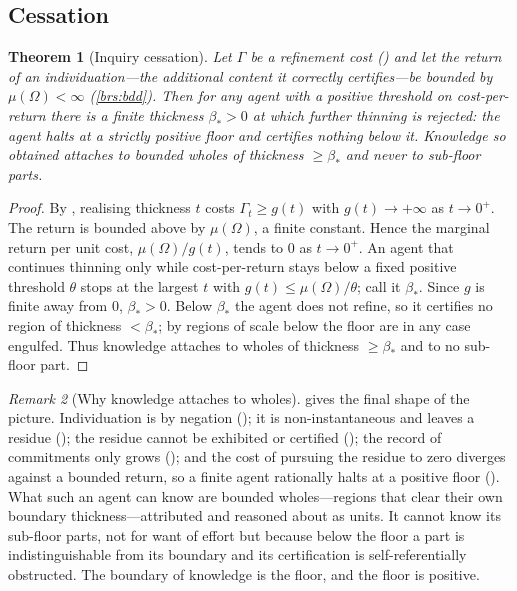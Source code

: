 \documentclass[11pt,a4paper]{article}
\theoremstyle{thmstyle}
\newtheorem{theorem}{Theorem}[section]
\theoremstyle{definition}
\theoremstyle{remark}
\newtheorem{remark}[theorem]{Remark}
\newcommand{\Space}{\Omega}
\newcommand{\thick}{\beta}
\begin{document}
\subsection{Cessation}

\begin{theorem}[Inquiry cessation]
\label{thm:cessation}
Let $\Gamma$ be a refinement cost \textup{(}\textup{)} and let the
return of an individuation---the additional content it correctly certifies---be
bounded by $\mu(\Space)<\infty$ \textup{(}\ref{brs:bdd}\textup{)}. Then for any
agent with a positive threshold on cost-per-return there is a finite thickness
$\thick_\ast>0$ at which further thinning is rejected: the agent halts at a
strictly positive floor and certifies nothing below it. Knowledge so obtained
attaches to bounded wholes of thickness $\ge\thick_\ast$ and never to sub-floor
parts.
\end{theorem}

\begin{proof}
By , realising thickness $t$ costs $\Gamma_t\ge g(t)$ with
$g(t)\to+\infty$ as $t\to0^+$. The return is bounded above by $\mu(\Space)$, a
finite constant. Hence the marginal return per unit cost,
$\mu(\Space)/g(t)$, tends to $0$ as $t\to0^+$. An agent that continues thinning
only while cost-per-return stays below a fixed positive threshold $\theta$ stops
at the largest $t$ with $g(t)\le\mu(\Space)/\theta$; call it $\thick_\ast$. Since
$g$ is finite away from $0$, $\thick_\ast>0$. Below $\thick_\ast$ the agent does
not refine, so it certifies no region of thickness $<\thick_\ast$; by
 regions of scale below the floor are in any case
engulfed. Thus knowledge attaches to wholes of thickness $\ge\thick_\ast$ and to
no sub-floor part.
\end{proof}

\begin{remark}[Why knowledge attaches to wholes]
\label{rem:wholes}
 gives the final shape of the picture. Individuation is by
negation (); it is non-instantaneous and leaves a
residue (); the residue cannot be exhibited or certified
(); the record of commitments only grows
(); and the cost of pursuing the residue to zero diverges
against a bounded return, so a finite agent rationally halts at a positive floor
(). What such an agent can know are bounded wholes---regions
that clear their own boundary thickness---attributed and reasoned about as units.
It cannot know its sub-floor parts, not for want of effort but because below the
floor a part is indistinguishable from its boundary and its certification is
self-referentially obstructed. The boundary of knowledge is the floor, and the
floor is positive.
\end{remark}
\end{document}
